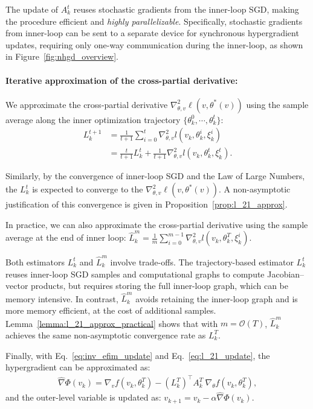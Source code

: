 \documentclass[11 pt]{article}
\begin{document}
\begin{remark}
    The update of $A_k^t$ reuses stochastic gradients from the inner-loop SGD, making the procedure efficient and \emph{highly parallelizable}.
    Specifically, stochastic gradients from inner-loop can be sent to a separate device for synchronous hypergradient updates, requiring only one-way communication during the inner-loop, as shown in Figure~\ref{fig:nhgd_overview}.
\end{remark}




\paragraph{Iterative approximation of the cross-partial derivative:} 
We approximate the cross-partial derivative $\nabla_{\theta,v}^2\ell(v,\theta^*(v))$ using the sample average along the inner optimization trajectory $\{\theta_k^{0},\cdots,\theta_k^{t}\}$:
\begin{align}\label{eq:l_21_update}
     L_k^{t+1}&=\frac{1}{t+1}\sum_{i=0}^{t} \nabla_{\theta,v}^2l(v_k,\theta_k^{i},\xi_k^i)\nonumber\\
     &=\frac{t}{t+1}L^{t}_k + \frac{1}{t+1}  \nabla_{\theta,v}^2l (v_k,\theta_k^t, \xi_k^t). 
\end{align}

Similarly, by the convergence of inner-loop SGD and the Law of Large Numbers, the $L_k^t$  is expected to converge to the $\nabla_{\theta,v}^2\ell(v,\theta^*(v))$. A non-asymptotic justification of this convergence is given in Proposition~\ref{prop:l_21_approx}.

In practice, we can also approximate the cross-partial derivative using the sample average at the end of inner loop: $\hat{L}_k^{m}
    =
    \frac{1}{m}
    \sum_{i=0}^{m-1}
    \nabla_{\theta,v}^2 l(v_k,\theta_k^{T},\xi_k^{i})$. 

Both estimators $L_k^t$ and $\hat{L}_k^{m}$ involve trade-offs.
The trajectory-based estimator $L_k^t$ reuses inner-loop SGD samples and computational graphs to compute Jacobian–vector products, but requires storing the full inner-loop graph, which can be memory intensive.
In contrast, $\hat{L}_k^{m}$ avoids retaining the inner-loop graph and is more memory efficient, at the cost of additional samples.
Lemma~\ref{lemma:l_21_approx_practical} shows that with $m=\mathcal{O}(T)$, $\hat{L}_k^{m}$ achieves the same non-asymptotic convergence rate as $L_k^{T}$.

Finally, with Eq.~\eqref{eq:inv_efim_update} and Eq.~\eqref{eq:l_21_update}, 
the hypergradient can be approximated as:
\begin{align*}
\label{eq:hypergrad_update}
    \widehat{\nabla} \Phi(v_k)=\nabla_v f(v_k, \theta_k^T)- (L_k^T)^\top A_k^T \ \nabla_\theta f(v_k,\theta_k^T),
\end{align*}
and the outer-level variable is updated as: $v_{k+1} =v_k -\alpha \widehat{\nabla} \Phi(v_k)$.
\end{document}
